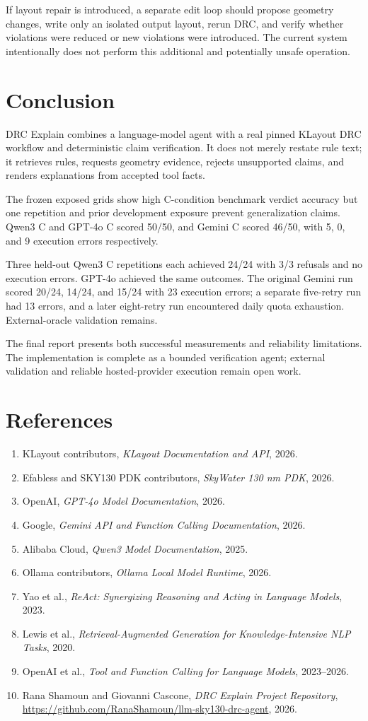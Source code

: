 \documentclass[10pt,twocolumn]{article}
\begin{document}
If layout repair is introduced, a separate edit loop should propose geometry changes,
write only an isolated output layout, rerun DRC, and verify whether violations were
reduced or new violations were introduced. The current system intentionally does not
perform this additional and potentially unsafe operation.

\clearpage
\section{Conclusion}
DRC Explain combines a language-model agent with a real pinned KLayout DRC workflow
and deterministic claim verification. It does not merely restate rule text; it
retrieves rules, requests geometry evidence, rejects unsupported claims, and renders
explanations from accepted tool facts.

The frozen exposed grids show high C-condition benchmark verdict accuracy but one
repetition and prior development exposure prevent generalization claims. Qwen3 C
and GPT-4o C scored 50/50, and Gemini C scored 46/50, with 5, 0, and 9 execution
errors respectively.

Three held-out Qwen3 C repetitions each achieved 24/24 with 3/3 refusals and no
execution errors. GPT-4o achieved the same outcomes. The original Gemini run scored
20/24, 14/24, and 15/24 with 23 execution errors; a separate five-retry run had
13 errors, and a later eight-retry run encountered daily quota exhaustion.
External-oracle validation remains.

The final report presents both successful measurements and reliability limitations.
The implementation is complete as a bounded verification agent; external validation
and reliable hosted-provider execution remain open work.

\section*{References}
\begin{enumerate}[leftmargin=*,itemsep=1pt]
\item KLayout contributors, \emph{KLayout Documentation and API}, 2026.
\item Efabless and SKY130 PDK contributors, \emph{SkyWater 130 nm PDK}, 2026.
\item OpenAI, \emph{GPT-4o Model Documentation}, 2026.
\item Google, \emph{Gemini API and Function Calling Documentation}, 2026.
\item Alibaba Cloud, \emph{Qwen3 Model Documentation}, 2025.
\item Ollama contributors, \emph{Ollama Local Model Runtime}, 2026.
\item Yao et al., \emph{ReAct: Synergizing Reasoning and Acting in Language Models}, 2023.
\item Lewis et al., \emph{Retrieval-Augmented Generation for Knowledge-Intensive NLP Tasks}, 2020.
\item OpenAI et al., \emph{Tool and Function Calling for Language Models}, 2023--2026.
\item Rana Shamoun and Giovanni Cascone, \emph{DRC Explain Project Repository},
      \url{https://github.com/RanaShamoun/llm-sky130-drc-agent}, 2026.
\end{enumerate}
\end{document}
